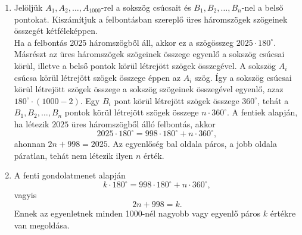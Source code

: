 \begin{solution}
\begin{enumerate}
    \item Jelöljük \(A_1,A_2,\ldots, A_{1000}\)-rel a sokszög csúcsait és \(B_1,B_2,\ldots, B_n\)-nel a belső pontokat. Kiszámítjuk a felbontásban szereplő üres háromszögek szögeinek összegét kétféleképpen.\\
    Ha a felbontás 2025 háromszögből áll, akkor ez a szögösszeg \(2025\cdot 180^\circ\). Másrészt az üres háromszögek szögeinek összege egyenlő a sokszög csúcsai körül, illetve a belső pontok körül létrejött szögek összegével. A sokszög \(A_i\) csúcsa körül létrejött szögek összege éppen az \(A_i\) szög. Így a sokszög csúcsai körül létrejött szögek összege a sokszög szögeinek összegével egyenlő, azaz \(180^\circ\cdot(1000-2)\).
    Egy \(B_i\) pont körül létrejött szögek összege \(360^\circ\), tehát a \(B_1,B_2,\ldots, B_n\) pontok körül létrejött szögek összege \(n\cdot 360^\circ\). 
    A fentiek alapján, ha létezik \(2025\) üres háromszögből álló felbontás, akkor
    \[2025\cdot 180^\circ=998\cdot 180^\circ+n\cdot 360^\circ,\]
    ahonnan \(2n+998=2025\). Az egyenlőség bal oldala páros, a jobb oldala páratlan, tehát nem létezik ilyen \(n\) érték.
    \item A fenti gondolatmenet alapján 
    \[k\cdot180^\circ=998\cdot180^\circ+n\cdot360^\circ, \]
    vagyis \[2n+998=k.\]
    Ennek az egyenletnek minden 1000-nél nagyobb vagy egyenlő páros \(k\) értékre van megoldása.
\end{enumerate} 
\end{solution}

